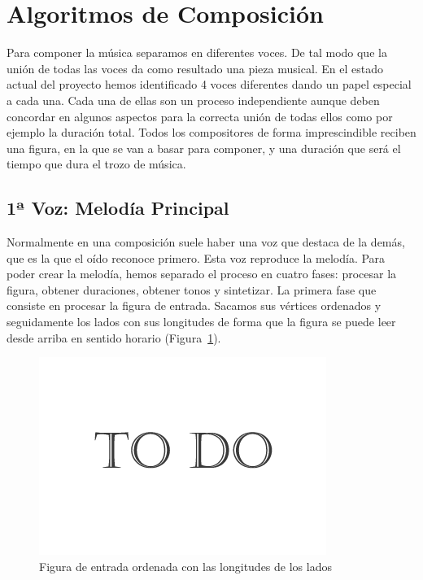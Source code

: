 \section{Algoritmos de Composición}

Para componer la música separamos en diferentes voces. De tal modo que la unión de todas las voces da como resultado una pieza musical. En el estado actual del proyecto hemos identificado 4 voces diferentes dando un papel especial a cada una. Cada una de ellas son un proceso independiente aunque deben concordar en algunos aspectos para la correcta unión de todas ellos como por ejemplo la duración total. Todos los compositores de forma imprescindible reciben una figura, en la que se van a basar para componer, y una duración que será el tiempo que dura el trozo de música.

\subsection{1ª Voz: Melodía Principal}

Normalmente en una composición suele haber una voz que destaca de la demás, que es la que el oído reconoce primero. Esta voz reproduce la melodía. Para poder crear la melodía, hemos separado el proceso en cuatro fases: procesar la figura, obtener duraciones, obtener tonos y sintetizar. 
La primera fase que consiste en procesar la figura de entrada. Sacamos sus vértices ordenados y seguidamente los lados con sus longitudes de forma que la figura se puede leer desde arriba en sentido horario (Figura~\ref{fig:Figura1Voz1}).

		\begin{figure}[htbp]
		\centering
		\hspace*{0.0in}
		\includegraphics[scale=0.57]{graphics/todo.png}
		\caption{Figura de entrada ordenada con las longitudes de los lados}
		\label{fig:Figura1Voz1}
		\end{figure}

